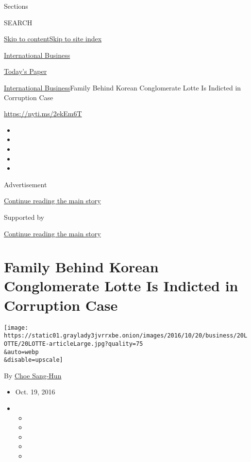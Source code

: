 Sections

SEARCH

\protect\hyperlink{site-content}{Skip to
content}\protect\hyperlink{site-index}{Skip to site index}

\href{https://www.nytimes3xbfgragh.onion/section/business}{International
Business}

\href{https://myaccount.nytimes3xbfgragh.onion/auth/login?response_type=cookie\&client_id=vi}{}

\href{https://www.nytimes3xbfgragh.onion/section/todayspaper}{Today's
Paper}

\href{/section/business}{International Business}\textbar{}Family Behind
Korean Conglomerate Lotte Is Indicted in Corruption Case

\url{https://nyti.ms/2ekEm6T}

\begin{itemize}
\item
\item
\item
\item
\item
\end{itemize}

Advertisement

\protect\hyperlink{after-top}{Continue reading the main story}

Supported by

\protect\hyperlink{after-sponsor}{Continue reading the main story}

\hypertarget{family-behind-korean-conglomerate-lotte-is-indicted-in-corruption-case}{%
\section{Family Behind Korean Conglomerate Lotte Is Indicted in
Corruption
Case}\label{family-behind-korean-conglomerate-lotte-is-indicted-in-corruption-case}}

\texttt{[image: https://static01.graylady3jvrrxbe.onion/images/2016/10/20/business/20LOTTE/20LOTTE-articleLarge.jpg?quality=75\\\&auto=webp\\\&disable=upscale]}

By \href{http://www.nytimes3xbfgragh.onion/by/choe-sang-hun}{Choe
Sang-Hun}

\begin{itemize}
\item
  Oct. 19, 2016
\item
  \begin{itemize}
  \item
  \item
  \item
  \item
  \item
  \end{itemize}
\end{itemize}

